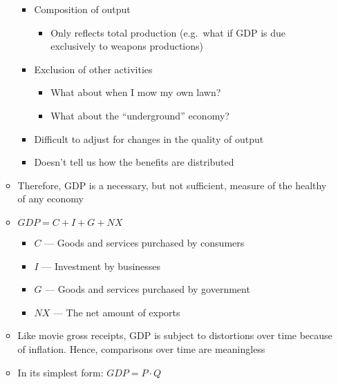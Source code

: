 \documentclass[12pt]{article}
\begin{document}
\begin{enumerate}
\begin{itemize}
        \begin{itemize}

          \item Composition of output

            \begin{itemize}

              \item Only reflects total production (e.g.\ what if GDP is due exclusively to weapons productions)

            \end{itemize}

          \item Exclusion of other activities

            \begin{itemize}

              \item What about when I mow my own lawn?

              \item What about the “underground” economy?

            \end{itemize}

          \item Difficult to adjust for changes in the quality of output

          \item Doesn't tell us how the benefits are distributed

        \end{itemize}

      \item Therefore, GDP is a necessary, but not sufficient, measure of the healthy of any economy

      \item $GDP = C + I + G + NX$

        \begin{itemize}

          \item $C$ — Goods and services purchased by consumers

          \item $I$ — Investment by businesses

          \item $G$ — Goods and services purchased by government

          \item $NX$ — The net amount of exports

        \end{itemize}

      \item Like movie gross receipts, GDP is subject to distortions over time because of inflation. Hence, comparisons over time are meaningless

      \item In its simplest form: $GDP = P\cdot Q$

    \end{itemize}

\end{enumerate}
\end{document}
